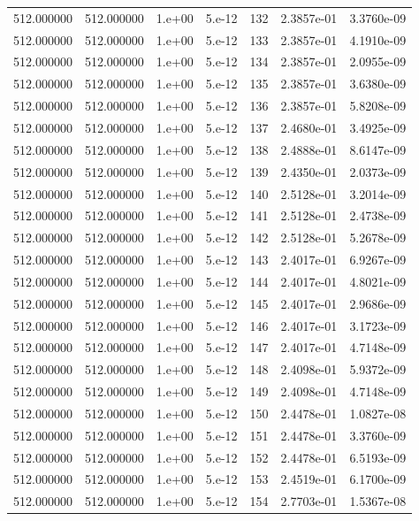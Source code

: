 \begin{table}[htbp]
\begin{tabular}{rrrrrrr}
512.000000 & 512.000000 & 1.e+00 & 5.e-12 & 132 & 2.3857e-01 & 3.3760e-09 \\
512.000000 & 512.000000 & 1.e+00 & 5.e-12 & 133 & 2.3857e-01 & 4.1910e-09 \\
512.000000 & 512.000000 & 1.e+00 & 5.e-12 & 134 & 2.3857e-01 & 2.0955e-09 \\
512.000000 & 512.000000 & 1.e+00 & 5.e-12 & 135 & 2.3857e-01 & 3.6380e-09 \\
512.000000 & 512.000000 & 1.e+00 & 5.e-12 & 136 & 2.3857e-01 & 5.8208e-09 \\
512.000000 & 512.000000 & 1.e+00 & 5.e-12 & 137 & 2.4680e-01 & 3.4925e-09 \\
512.000000 & 512.000000 & 1.e+00 & 5.e-12 & 138 & 2.4888e-01 & 8.6147e-09 \\
512.000000 & 512.000000 & 1.e+00 & 5.e-12 & 139 & 2.4350e-01 & 2.0373e-09 \\
512.000000 & 512.000000 & 1.e+00 & 5.e-12 & 140 & 2.5128e-01 & 3.2014e-09 \\
512.000000 & 512.000000 & 1.e+00 & 5.e-12 & 141 & 2.5128e-01 & 2.4738e-09 \\
512.000000 & 512.000000 & 1.e+00 & 5.e-12 & 142 & 2.5128e-01 & 5.2678e-09 \\
512.000000 & 512.000000 & 1.e+00 & 5.e-12 & 143 & 2.4017e-01 & 6.9267e-09 \\
512.000000 & 512.000000 & 1.e+00 & 5.e-12 & 144 & 2.4017e-01 & 4.8021e-09 \\
512.000000 & 512.000000 & 1.e+00 & 5.e-12 & 145 & 2.4017e-01 & 2.9686e-09 \\
512.000000 & 512.000000 & 1.e+00 & 5.e-12 & 146 & 2.4017e-01 & 3.1723e-09 \\
512.000000 & 512.000000 & 1.e+00 & 5.e-12 & 147 & 2.4017e-01 & 4.7148e-09 \\
512.000000 & 512.000000 & 1.e+00 & 5.e-12 & 148 & 2.4098e-01 & 5.9372e-09 \\
512.000000 & 512.000000 & 1.e+00 & 5.e-12 & 149 & 2.4098e-01 & 4.7148e-09 \\
512.000000 & 512.000000 & 1.e+00 & 5.e-12 & 150 & 2.4478e-01 & 1.0827e-08 \\
512.000000 & 512.000000 & 1.e+00 & 5.e-12 & 151 & 2.4478e-01 & 3.3760e-09 \\
512.000000 & 512.000000 & 1.e+00 & 5.e-12 & 152 & 2.4478e-01 & 6.5193e-09 \\
512.000000 & 512.000000 & 1.e+00 & 5.e-12 & 153 & 2.4519e-01 & 6.1700e-09 \\
512.000000 & 512.000000 & 1.e+00 & 5.e-12 & 154 & 2.7703e-01 & 1.5367e-08 \\

\end{tabular}
\end{table}
